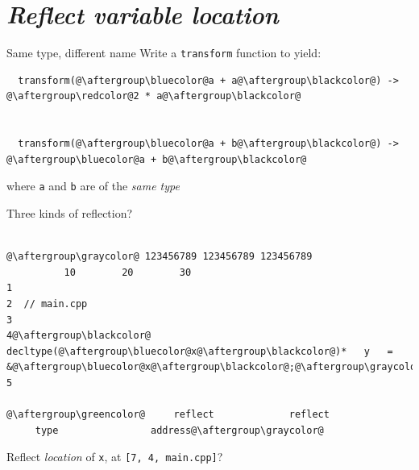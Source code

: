 \documentclass[xcolor=dvipsnames]{beamer}
\begin{document}
\section{\protect\textit{Reflect variable location}}


\begin{frame}[fragile]{Same type, different name}
Write a \texttt{transform} function to yield:\vspace{10mm}
\begin{lstlisting}
  transform(@\aftergroup\bluecolor@a + a@\aftergroup\blackcolor@) -> @\aftergroup\redcolor@2 * a@\aftergroup\blackcolor@


  transform(@\aftergroup\bluecolor@a + b@\aftergroup\blackcolor@) -> @\aftergroup\bluecolor@a + b@\aftergroup\blackcolor@
\end{lstlisting}
\vspace{10mm}where {\color{blue}\texttt{a}} and {\color{blue}\texttt{b}} are of the \emph{same type}
\end{frame}


\begin{frame}[fragile]{Three kinds of reflection?}
  \begin{lstlisting}

@\aftergroup\graycolor@ 123456789 123456789 123456789
          10        20        30
1
2  // main.cpp
3
4@\aftergroup\blackcolor@  decltype(@\aftergroup\bluecolor@x@\aftergroup\blackcolor@)*   y   =   &@\aftergroup\bluecolor@x@\aftergroup\blackcolor@;@\aftergroup\graycolor@
5

@\aftergroup\greencolor@     reflect             reflect
     type                address@\aftergroup\graycolor@
  \end{lstlisting}
 \vspace{10mm}
Reflect \emph{location} of {\color{blue}\texttt{x}}, at {\color{red}\texttt{[7, 4, main.cpp]}}?
\end{frame}
\end{document}
